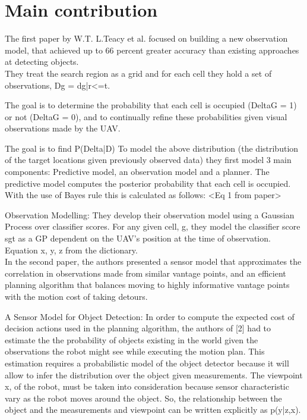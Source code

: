 \documentclass{article}
\begin{document}
	\section{Main contribution}
	The first paper by W.T. L.Teacy et al. focused on building a new observation model, that achieved up to 66 percent greater accuracy than existing approaches at detecting objects. \\
	
	They treat the search region as a grid and for each cell they hold a set of observations, Dg = {dg|r<=t}.  
	
	The goal is to determine the probability that each cell is occupied (DeltaG = 1) or not (DeltaG = 0), and to continually refine these probabilities given visual observations made by the UAV.
	
	The goal is to find P(Delta|D)
	To model the above distribution (the distribution of the target locations given previously observed data) they first model 3 main components: Predictive model, an observation model and a planner.
	The predictive model computes the posterior probability that each cell is occupied. With the use of Bayes rule this is calculated as follows:
	<Eq 1 from paper>
	
	Observation Modelling: They develop their observation model using a Gaussian Process over classifier scores. For any given cell, g, they model the classifier score sgt as a GP dependent on the UAV's position at the time of observation. Equation x, y, z from the dictionary. \\
	
	
	In the second paper, the authors presented a sensor model that approximates the correlation in observations made from similar vantage points, and an efficient planning algorithm that balances moving to highly informative vantage points with the motion cost of taking detours.

	A Sensor Model for Object Detection:	
	In order to compute the expected cost of decision actions used in the planning algorithm, the authors of [2] had to estimate the the probability of objects existing in the world given the observations the robot might see while executing the motion plan. This estimation requires a probabilistic model of the object detector because it will allow to infer the distribution over the object given measurements. The viewpoint x, of the robot, must be taken into consideration because sensor characteristic vary as the robot moves around the object. So, the relationship between the object and the measurements and viewpoint can be written explicitly as p(y|z,x).
	
\end{document}
